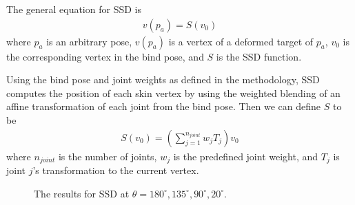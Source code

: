 \documentclass[11pt,twocolumn,letterpaper]{article}
\begin{document}
The general equation for SSD is
\begin{align} v(p_a) = S(v_0) \end{align}
where $p_a$ is an arbitrary pose, $v(p_a)$ is a vertex of a deformed target of $p_a$, $v_0$ is the corresponding vertex in the bind pose, and $S$ is the SSD function.

Using the bind pose and joint weights as defined in the methodology, SSD computes the position of each skin vertex by using the weighted blending of an affine transformation of each joint from the bind pose. Then we can define $S$ to be
\begin{align} S(v_0) = (\sum_{j=1}^{n_{joint}} w_j T_j) v_0 
\label{ssd_eq}
\end{align}
where $n_{joint}$ is the number of joints, $w_j$ is the predefined joint weight, and $T_j$ is joint $j$'s transformation to the current vertex.

\begin{figure}
\begin{center}
\end{center}
   \caption{The results for SSD at $\theta = 180^{\circ}, 135^{\circ}, 90^{\circ}, 20^{\circ}$.}
\label{fig:short}
\label{ssd_r}
\end{figure}
\end{document}
